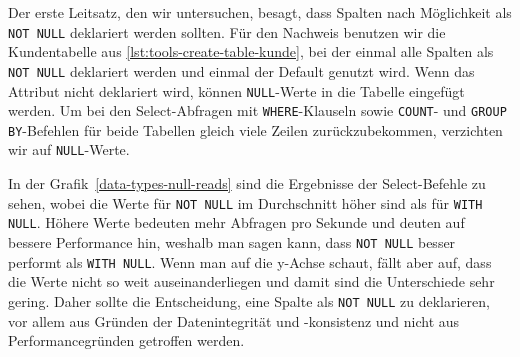 Der erste Leitsatz, den wir untersuchen, besagt, dass Spalten nach Möglichkeit als \texttt{NOT NULL} deklariert werden sollten.
Für den Nachweis benutzen wir die Kundentabelle aus \ref{lst:tools-create-table-kunde}, bei der einmal alle Spalten als \texttt{NOT NULL} deklariert werden und einmal der Default genutzt wird.
Wenn das Attribut nicht deklariert wird, können \texttt{NULL}-Werte in die Tabelle eingefügt werden.
Um bei den Select-Abfragen mit \texttt{WHERE}-Klauseln sowie \texttt{COUNT}- und \texttt{GROUP BY}-Befehlen für beide Tabellen gleich viele Zeilen zurückzubekommen, verzichten wir auf \texttt{NULL}-Werte.

In der Grafik~\ref{data-types-null-reads} sind die Ergebnisse der Select-Befehle zu sehen, wobei die Werte für \texttt{NOT NULL} im Durchschnitt höher sind als für \texttt{WITH NULL}.
Höhere Werte bedeuten mehr Abfragen pro Sekunde und deuten auf bessere Performance hin, weshalb man sagen kann, dass \texttt{NOT NULL} besser performt als \texttt{WITH NULL}.
Wenn man auf die y-Achse schaut, fällt aber auf, dass die Werte nicht so weit auseinanderliegen und damit sind die Unterschiede sehr gering.
Daher sollte die Entscheidung, eine Spalte als \texttt{NOT NULL} zu deklarieren, vor allem aus Gründen der Datenintegrität und -konsistenz und nicht aus Performancegründen getroffen werden.

